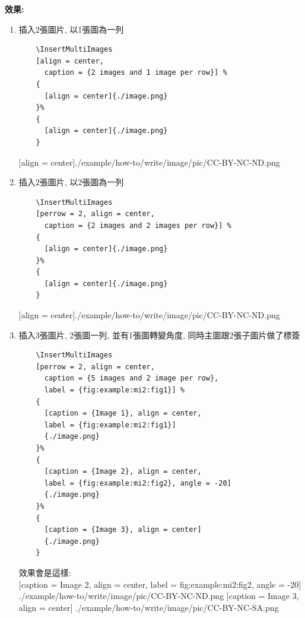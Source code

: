   {\bf 效果:}
  \begin{enumerate}
  \item
  {
    插入2張圖片, 以1張圖為一列
    \begin{verbatim}
    \InsertMultiImages
    [align = center,
      caption = {2 images and 1 image per row}] %
    {
      [align = center]{./image.png}
    }%
    {
      [align = center]{./image.png}
    }
    \end{verbatim}
    {
      [align = center]{./example/how-to/write/image/pic/CC-BY-NC-ND.png}
    }
  } %

  \item
  {
    插入2張圖片, 以2張圖為一列
    \begin{verbatim}
    \InsertMultiImages
    [perrow = 2, align = center,
      caption = {2 images and 2 images per row}] %
    {
      [align = center]{./image.png}
    }%
    {
      [align = center]{./image.png}
    }
    \end{verbatim}
    {
      [align = center]{./example/how-to/write/image/pic/CC-BY-NC-ND.png}
    }
  } %

  \newpage
  \item
  {
    插入3張圖片, 2張圖一列, 並有1張圖轉變角度, 同時主圖跟2張子圖片做了標簽
    \begin{verbatim}
    \InsertMultiImages
    [perrow = 2, align = center,
      caption = {5 images and 2 image per row},
      label = {fig:example:mi2:fig1}] %
    {
      [caption = {Image 1}, align = center,
      label = {fig:example:mi2:fig1}]
      {./image.png}
    }%
    {
      [caption = {Image 2}, align = center,
      label = {fig:example:mi2:fig2}, angle = -20]
      {./image.png}
    }%
    {
      [caption = {Image 3}, align = center]
      {./image.png}
    }
    \end{verbatim}

    效果會是這樣: \\
    {
      [caption = {Image 2},
      align = center,
      label = {fig:example:mi2:fig2},
      angle = -20]
      {./example/how-to/write/image/pic/CC-BY-NC-ND.png}
    }%
    {
      [caption = {Image 3}, align = center]
      {./example/how-to/write/image/pic/CC-BY-NC-SA.png}
    }

}
\end{enumerate}
